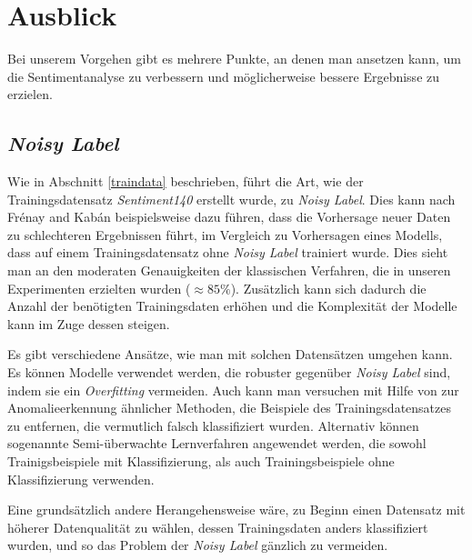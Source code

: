 \section{Ausblick}


Bei unserem Vorgehen gibt es mehrere Punkte, an denen man ansetzen kann, um die Sentimentanalyse zu verbessern und möglicherweise bessere Ergebnisse zu erzielen.

\subsection{\textit{Noisy Label}}
Wie in Abschnitt \ref{traindata} beschrieben, führt die Art, wie der Trainingsdatensatz \textit{Sentiment140} erstellt wurde, zu \textit{Noisy Label}. Dies kann nach Fr{\'e}nay and Kab{\'a}n \cite{NoisyLabel2014} beispielsweise dazu führen, dass die Vorhersage neuer Daten zu schlechteren Ergebnissen führt, im Vergleich zu Vorhersagen eines Modells, dass auf einem Trainingsdatensatz ohne \textit{Noisy Label} trainiert wurde. Dies sieht man an den moderaten Genauigkeiten der klassischen Verfahren, die in unseren Experimenten erzielten wurden ($\approx{85} \%$). Zusätzlich kann sich dadurch die Anzahl der benötigten Trainingsdaten erhöhen und die Komplexität der Modelle kann im Zuge dessen steigen.

Es gibt verschiedene Ansätze, wie man mit solchen Datensätzen umgehen kann. Es können Modelle verwendet werden, die robuster gegenüber \textit{Noisy Label} sind, indem sie ein \textit{Overfitting} vermeiden. Auch kann man versuchen mit Hilfe von zur Anomalieerkennung ähnlicher Methoden, die Beispiele des Trainingsdatensatzes zu entfernen, die vermutlich falsch klassifiziert wurden. Alternativ können sogenannte Semi-überwachte Lernverfahren angewendet werden, die sowohl Trainigsbeispiele mit Klassifizierung, als auch Trainingsbeispiele ohne Klassifizierung verwenden. 

Eine grundsätzlich andere Herangehensweise wäre, zu Beginn einen Datensatz mit höherer Datenqualität zu wählen, dessen Trainingsdaten anders klassifiziert wurden, und so das Problem der \textit{Noisy Label} gänzlich zu vermeiden.



